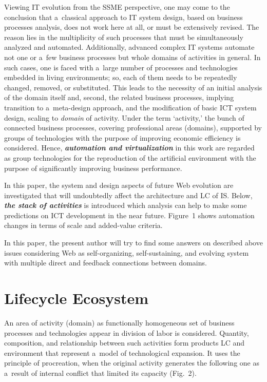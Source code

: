 \begin{multicols}{2}
 Viewing IT evolution from the SSME perspective, one may come to the conclusion that a~classical
approach to IT system design, based on business processes analysis, does not work here at all, or must be
extensively revised. The reason lies in the multiplicity of such processes that must be simultaneously
analyzed and automated.
Additionally, advanced complex IT systems automate not one or a~few business
processes but whole domains of activities in general. In such cases,
one is faced with a~large number of
processes and technologies embedded in living environments; so, each of them needs to be repeatedly
changed, removed, or substituted. This leads to the necessity of an initial analysis of the domain
itself and,
second, the related business processes, implying transition to a~meta-design approach, and the
modification of basic ICT system design, scaling to \textit{domain} of activity. Under the term `activity,'
the bunch of connected business processes, covering professional areas (domains), supported by
groups of technologies with the purpose of improving economic efficiency
is considered.
Hence,
{\bfseries\textit{automation and virtualization}} in this work are regarded as group technologies for the
reproduction of the artificial environment with the purpose of significantly improving business
performance.

 In this paper, the system and design aspects of future Web evolution
 are investigated that will
undoubtedly affect the architecture and LC of IS. Below,
{\bfseries\textit{the stack of activities}} is introduced which analysis can help
to make some predictions on ICT
development in the near future. Figure~1 shows automation changes in terms of scale and added-value
criteria.


 In this paper, the present author will try to find some answers on described above issues considering Web as
 self-organizing, self-sustaining, and evolving system with multiple direct and feedback connections
between domains.

\vspace*{-3pt}

\section{Lifecycle Ecosystem}

 \noindent
 An area of activity (domain) as functionally homogeneous set of business processes and
technologies appear in division of labor is considered.
Quantity, composition, and relationship between such activities
form products LC and environment that represent a~model of technological expansion. It uses
the principle of procreation, when the original activity generates the following one as a~result of internal
conflict that limited its capacity (Fig.~2).



\end{multicols}
